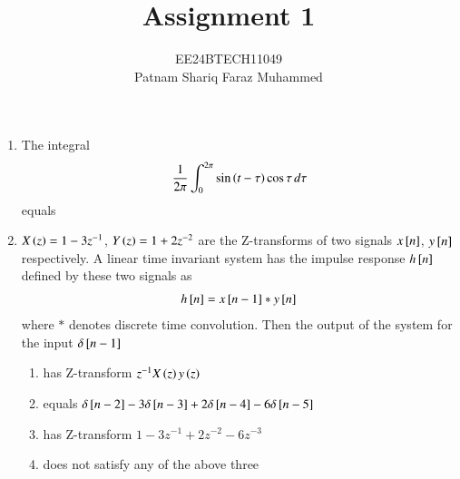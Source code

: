 \documentclass[journal]{IEEEtran}
\numberwithin{equation}{enumi}
\numberwithin{figure}{enumi}
\begin{document}


\title{Assignment 1}
\author{EE24BTECH11049 \\ Patnam Shariq Faraz Muhammed}

{\let\newpage\relax\maketitle}

\begin{enumerate}

    \item 
    The integral 
    \begin{align*}
        \frac{1}{2\pi} \int_0^{2\pi} \sin{\ensuremath{\left(t-\tau\right)}}\cos{\tau}\, d\tau
    \end{align*}
    equals
    \hfill{}
    \begin{enumerate}
    \end{enumerate}

    \item 
    $X\left(z\right) = 1 - 3z^{-1}$, $Y\left(z\right) = 1 + 2z^{-2}$ are the Z-transforms of two signals $x{}\left[n\right]$, $y{}\left[n\right]$ respectively. A linear time invariant system has the impulse response $h{}\left[n\right]$ defined by these two signals as 
    \begin{align*}
        h{}\left[n\right] = x{}\left[n-1\right] * y{}\left[n\right]
    \end{align*}
    where $*$ denotes discrete time convolution. Then the output of the system for the input $\delta{}\left[n-1\right]$
    \hfill{}
    \begin{enumerate}
        \item has Z-transform $z^{-1}X\left(z\right)y\left(z\right)$
        \item equals $\delta{}\left[n - 2\right] - 3\delta{}\left[n - 3\right] + 2\delta{}\left[n - 4\right] - 6\delta{}\left[n - 5\right]$
        \item has Z-transform $1 - 3z^{-1} + 2z^{-2} - 6z^{-3} $ 
        \item does not satisfy any of the above three
    \end{enumerate}


\end{enumerate}
\end{document}
